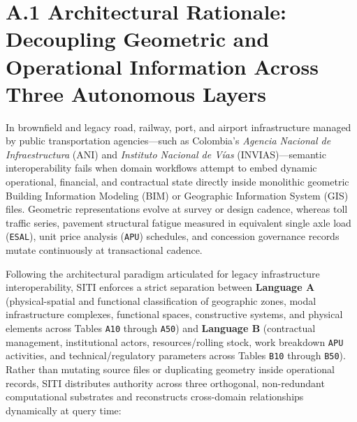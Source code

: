 \documentclass[10pt,a4paper]{article}
\begin{document}
\section*{A.1 Architectural Rationale: Decoupling Geometric and Operational Information Across Three Autonomous Layers}

In brownfield and legacy road, railway, port, and airport infrastructure managed by public transportation agencies---such as Colombia's \textit{Agencia Nacional de Infraestructura} (ANI) and \textit{Instituto Nacional de Vías} (INVIAS)---semantic interoperability fails when domain workflows attempt to embed dynamic operational, financial, and contractual state directly inside monolithic geometric Building Information Modeling (BIM) or Geographic Information System (GIS) files. Geometric representations evolve at survey or design cadence, whereas toll traffic series, pavement structural fatigue measured in equivalent single axle load (\texttt{ESAL}), unit price analysis (\texttt{APU}) schedules, and concession governance records mutate continuously at transactional cadence.

Following the architectural paradigm articulated for legacy infrastructure interoperability, SITI enforces a strict separation between \textbf{Language A} (physical-spatial and functional classification of geographic zones, modal infrastructure complexes, functional spaces, constructive systems, and physical elements across Tables \texttt{A10} through \texttt{A50}) and \textbf{Language B} (contractual management, institutional actors, resources/rolling stock, work breakdown \texttt{APU} activities, and technical/regulatory parameters across Tables \texttt{B10} through \texttt{B50}). Rather than mutating source files or duplicating geometry inside operational records, SITI distributes authority across three orthogonal, non-redundant computational substrates and reconstructs cross-domain relationships dynamically at query time:
\end{document}
